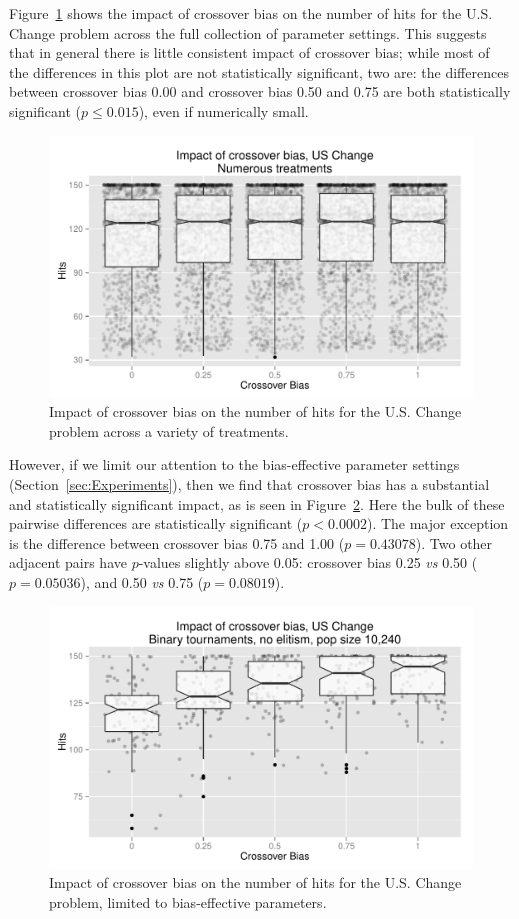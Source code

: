 \documentclass{sig-alternate}
\begin{document}
Figure~\ref{fig:USChange_Hits} shows the impact of crossover bias on the number of hits for the U.S. Change problem
across the full collection of parameter settings. This suggests that in general there is little consistent impact of
crossover bias; while most of the differences in this plot are not statistically significant, two are: the differences
between crossover bias 0.00 and crossover bias 0.50 and 0.75 are both statistically significant ($p \leq 0.015$), even
if numerically small.

\begin{figure}
\centering
\includegraphics[width=0.45 \textwidth]{Plots/US_change_hits.pdf}
\caption{Impact of crossover bias on the number of hits for the U.S. Change problem across a variety of treatments.}
\label{fig:USChange_Hits}
\end{figure}

%
%
%
%

However, if we limit our attention to the bias-effective parameter settings (Section~\ref{sec:Experiments}), then we
find that crossover bias has a substantial and statistically significant impact, as is seen in
Figure~\ref{fig:USChange_Hits_strong}. Here the bulk of these pairwise differences are statistically significant
($p<0.0002$). The major exception is the difference between crossover bias 0.75 and 1.00 ($p=0.43078$). Two other
adjacent pairs have $p$-values slightly above 0.05: crossover bias 0.25 \emph{vs} 0.50 ($p=0.05036$), and 0.50
\emph{vs} 0.75 ($p=0.08019$).

\begin{figure}
\centering
\includegraphics[width=0.45 \textwidth]{Plots/US_change_hits_strong.pdf}
\caption{Impact of crossover bias on the number of hits for the U.S. Change problem, limited to bias-effective
parameters.}
\label{fig:USChange_Hits_strong}
\end{figure}
\end{document}
